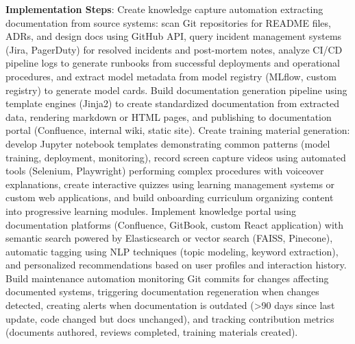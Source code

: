 \textbf{Implementation Steps}: Create knowledge capture automation extracting documentation from source systems: scan Git repositories for README files, ADRs, and design docs using GitHub API, query incident management systems (Jira, PagerDuty) for resolved incidents and post-mortem notes, analyze CI/CD pipeline logs to generate runbooks from successful deployments and operational procedures, and extract model metadata from model registry (MLflow, custom registry) to generate model cards. Build documentation generation pipeline using template engines (Jinja2) to create standardized documentation from extracted data, rendering markdown or HTML pages, and publishing to documentation portal (Confluence, internal wiki, static site). Create training material generation: develop Jupyter notebook templates demonstrating common patterns (model training, deployment, monitoring), record screen capture videos using automated tools (Selenium, Playwright) performing complex procedures with voiceover explanations, create interactive quizzes using learning management systems or custom web applications, and build onboarding curriculum organizing content into progressive learning modules. Implement knowledge portal using documentation platforms (Confluence, GitBook, custom React application) with semantic search powered by Elasticsearch or vector search (FAISS, Pinecone), automatic tagging using NLP techniques (topic modeling, keyword extraction), and personalized recommendations based on user profiles and interaction history. Build maintenance automation monitoring Git commits for changes affecting documented systems, triggering documentation regeneration when changes detected, creating alerts when documentation is outdated (>90 days since last update, code changed but docs unchanged), and tracking contribution metrics (documents authored, reviews completed, training materials created).

